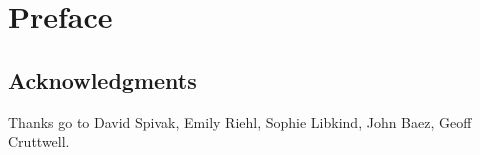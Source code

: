 \documentclass[DynamicalBook]{subfiles}
\begin{document}
%


\setcounter{chapter}{0}%


\chapter{Preface}\label{chapter.0}



\section*{Acknowledgments}

Thanks go to David Spivak, Emily Riehl, Sophie Libkind, John Baez, Geoff Cruttwell.
\end{document}
